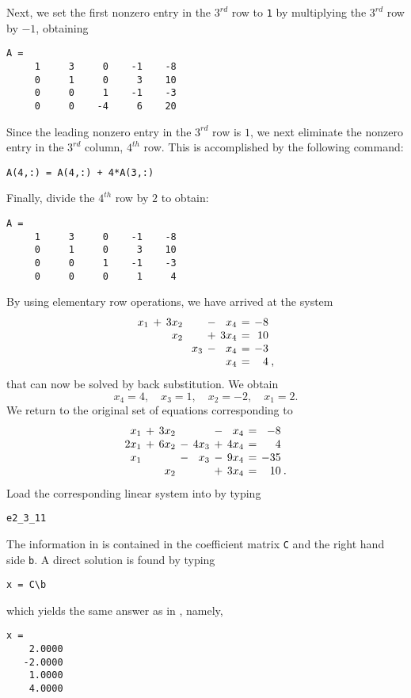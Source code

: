 Next, we set the first nonzero entry in the $3^{rd}$ row to {\tt 1}
by multiplying the $3^{rd}$ row by $-1$, obtaining
\begin{verbatim}
A =
     1     3     0    -1    -8
     0     1     0     3    10
     0     0     1    -1    -3
     0     0    -4     6    20
\end{verbatim}

Since the leading nonzero entry in the $3^{rd}$ row is $1$,  we
next eliminate the nonzero entry in the $3^{rd}$ column,
$4^{th}$ row. This is accomplished by the following \Matlab
command:
\begin{verbatim}
A(4,:) = A(4,:) + 4*A(3,:)
\end{verbatim}
Finally, divide the $4^{th}$ row by $2$ to obtain:
\begin{verbatim}
A =
     1     3     0    -1    -8
     0     1     0     3    10
     0     0     1    -1    -3
     0     0     0     1     4
\end{verbatim}

By using elementary row operations, we have arrived at the system
\begin{equation}
\arraycolsep 2pt
\begin{array}{rcrcrcrcrl}
  x_1 & + & 3x_2 &   &     & - &  x_4 & = &  -8 & \\
      &   &  x_2 &   &     & + & 3x_4 & = &  10 & \\
      &   &      &   & x_3 & - &  x_4 & = &  -3 & \\
      &   &      &   &     &   &  x_4 & = &   4 &\! ,
\end{array}
\end{equation}
that can now be solved by back substitution.  We obtain
\begin{equation} \label{ans1}
        x_4 = 4,\quad x_3 = 1,\quad x_2 = -2,\quad x_1 = 2.
\end{equation}
We return to the original set of equations corresponding to
\begin{equation*}    \label{examp4_con}
\arraycolsep 2pt
\begin{array}{rcrcrcrcrl}
  x_1 & + & 3x_2 &   &      & - &  x_4 & = &  -8  & \\
 2x_1 & + & 6x_2 & - & 4x_3 & + & 4x_4 & = &   4  & \\
  x_1 &   &      & - &  x_3 & - & 9x_4 & = & -35  & \\
      &   &  x_2 &   &      & + & 3x_4 & = &  10  & \! .
\end{array}
\end{equation*}
Load the corresponding linear system into \Matlab by typing
\begin{verbatim}
e2_3_11
\end{verbatim}
The information in  is contained in the
coefficient matrix {\tt C} and the right hand side {\tt b}.
A direct solution is found by typing
\begin{verbatim}
x = C\b
\end{verbatim}
which yields the same answer as in , namely,
\begin{verbatim}
x =
    2.0000
   -2.0000
    1.0000
    4.0000
\end{verbatim}

